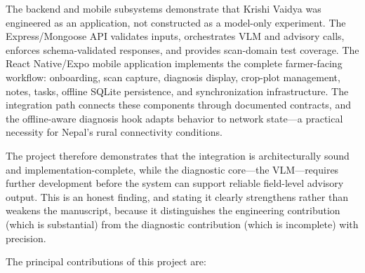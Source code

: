 The backend and mobile subsystems demonstrate that Krishi Vaidya was engineered as an
application, not constructed as a model-only experiment. The Express/Mongoose API validates
inputs, orchestrates VLM and advisory calls, enforces schema-validated responses, and provides
scan-domain test coverage. The React Native/Expo mobile application implements the complete
farmer-facing workflow: onboarding, scan capture, diagnosis display, crop-plot management,
notes, tasks, offline SQLite persistence, and synchronization infrastructure. The integration
path connects these components through documented contracts, and the offline-aware diagnosis
hook adapts behavior to network state---a practical necessity for Nepal's rural connectivity
conditions.

The project therefore demonstrates that the integration is architecturally sound and
implementation-complete, while the diagnostic core---the VLM---requires further development
before the system can support reliable field-level advisory output. This is an honest finding,
and stating it clearly strengthens rather than weakens the manuscript, because it distinguishes
the engineering contribution (which is substantial) from the diagnostic contribution (which
is incomplete) with precision.


The principal contributions of this project are:

